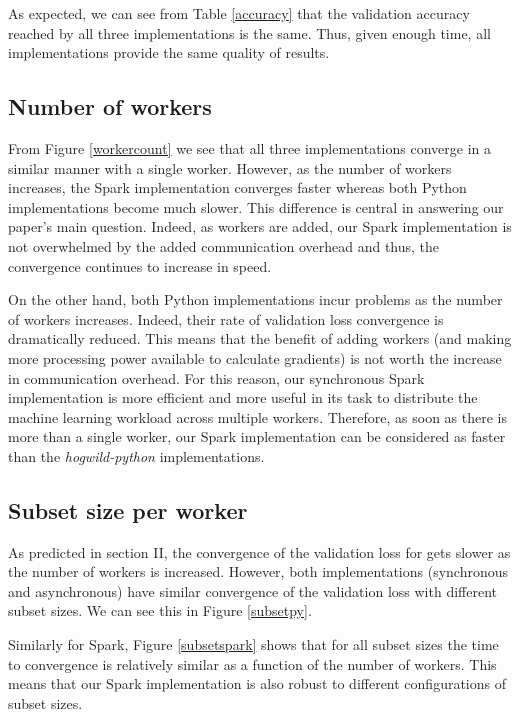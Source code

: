 \documentclass[a4paper, 11pt, conference]{ieeeconf}
\begin{document}
As expected, we can see from Table \ref{accuracy} that the validation accuracy reached by all three implementations is the same. Thus, given enough time, all implementations provide the same quality of results.


\subsection{Number of workers}

From Figure \ref{workercount} we see that all three implementations converge in a similar manner with a single worker. However, as the number of workers increases, the Spark implementation converges faster whereas both Python implementations become much slower.
This difference is central in answering our paper's main question. Indeed, as workers are added, our Spark implementation is not overwhelmed by the added communication overhead and thus, the convergence continues to increase in speed. 

On the other hand, both Python implementations incur problems as the number of workers increases. Indeed, their rate of validation loss convergence is dramatically reduced. This means that the benefit of adding workers (and making more processing power available to calculate gradients) is not worth the increase in communication overhead. For this reason, our synchronous Spark implementation is more efficient and more useful in its task to distribute the machine learning workload across multiple workers. Therefore, as soon as there is more than a single worker, our Spark implementation can be considered as faster than the \textit{hogwild-python} implementations.




\subsection{Subset size per worker}
As predicted in section II, the convergence of the validation loss for \cite{hogwild-python} gets slower as the number of workers is increased. However, both implementations (synchronous and asynchronous) have similar convergence of the validation loss with different subset sizes. We can see this in Figure \ref{subsetpy}.

Similarly for Spark, Figure \ref{subsetspark} shows that for all subset sizes the time to convergence is relatively similar as a function of the number of workers. This means that our Spark implementation is also robust to different configurations of subset sizes.
\end{document}
